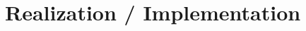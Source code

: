\documentclass{article}
\begin{document}



\section{Realization / Implementation} %
\label{sec:realization}
\end{document}
